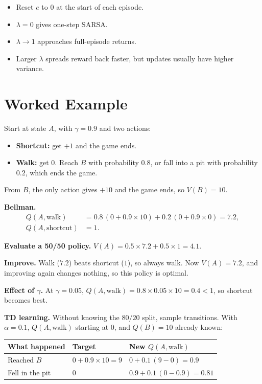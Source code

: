 \documentclass[11pt]{article}
\begin{document}
\begin{itemize}
  \item Reset $e$ to $0$ at the start of each episode.
  \item $\lambda = 0$ gives one-step SARSA.
  \item $\lambda \to 1$ approaches full-episode returns.
  \item Larger $\lambda$ spreads reward back faster, but updates usually have higher variance.
\end{itemize}

\section{Worked Example}

Start at state $A$, with $\gamma = 0.9$ and two actions:
\begin{itemize}
  \item \textbf{Shortcut:} get $+1$ and the game ends.
  \item \textbf{Walk:} get $0$. Reach $B$ with probability $0.8$, or fall into a pit
        with probability $0.2$, which ends the game.
\end{itemize}
From $B$, the only action gives $+10$ and the game ends, so $V(B) = 10$.

\textbf{Bellman.}
\begin{align*}
  Q(A, \text{walk}) &= 0.8\,(0 + 0.9 \times 10) + 0.2\,(0 + 0.9 \times 0) = 7.2, \\
  Q(A, \text{shortcut}) &= 1.
\end{align*}

\textbf{Evaluate a 50/50 policy.}
$V(A) = 0.5 \times 7.2 + 0.5 \times 1 = 4.1$.

\textbf{Improve.} Walk ($7.2$) beats shortcut ($1$), so always walk. Now $V(A) = 7.2$,
and improving again changes nothing, so this policy is optimal.

\textbf{Effect of $\gamma$.} At $\gamma = 0.05$,
$Q(A, \text{walk}) = 0.8 \times 0.05 \times 10 = 0.4 < 1$, so shortcut becomes best.

\textbf{TD learning.} Without knowing the $80/20$ split, sample transitions. With
$\alpha = 0.1$, $Q(A, \text{walk})$ starting at $0$, and $Q(B) = 10$ already known:

\begin{center}
\begin{tabular}{lll}
  \toprule
  \textbf{What happened} & \textbf{Target} & \textbf{New $Q(A, \text{walk})$} \\
  \midrule
  Reached $B$ & $0 + 0.9 \times 10 = 9$ & $0 + 0.1\,(9 - 0) = 0.9$ \\
  Fell in the pit & $0$ & $0.9 + 0.1\,(0 - 0.9) = 0.81$ \\
  \bottomrule
\end{tabular}
\end{center}
\end{document}
